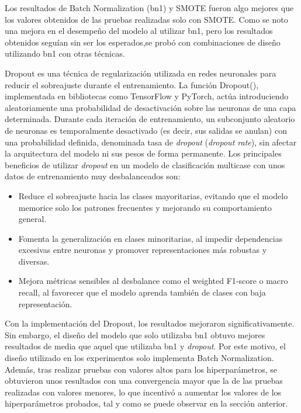 Los resultados de Batch Normalization (bn1) y SMOTE fueron algo mejores que los valores obtenidos de las pruebas realizadas solo con SMOTE. Como se noto una mejora en el desempeño del modelo al utilizar bn1, pero los resultados obtenidos seguían sin ser los esperados,se probó con combinaciones de diseño utilizando bn1 con otras técnicas.

Dropout es una técnica de regularización utilizada en redes neuronales para reducir el sobreajuste durante el entrenamiento. La función Dropout(), implementada en bibliotecas como TensorFlow y PyTorch, actúa introduciendo aleatoriamente una probabilidad de desactivación sobre las neuronas de una capa determinada. Durante cada iteración de entrenamiento, un subconjunto aleatorio de neuronas es temporalmente desactivado (es decir, sus salidas se anulan) con una probabilidad definida, denominada tasa de \textit{dropout} (\textit{dropout rate}), sin afectar la arquitectura del modelo ni sus pesos de forma permanente. Los principales beneficios de utilizar \textit{dropout} en un modelo de clasificación multicase con unos datos de entrenamiento muy desbalanceados son:

\begin{itemize}
	\item Reduce el sobreajuste hacia las clases mayoritarias, evitando que el modelo memorice solo los patrones frecuentes y mejorando su comportamiento general.

	\item Fomenta la generalización en clases minoritarias, al impedir dependencias excesivas entre neuronas y promover representaciones más robustas y diversas.

	\item Mejora métricas sensibles al desbalance como el weighted F1-score o macro recall, al favorecer que el modelo aprenda también de clases con baja representación.
\end{itemize}

Con la implementación del Dropout, los resultados mejoraron significativamente. Sin embargo, el diseño del modelo que solo utilizaba bn1 obtuvo mejores resultados de media que aquel que utilizaba bn1 y \textit{dropout}. Por este motivo, el diseño utilizado en los experimentos solo implementa Batch Normalization. Además, tras realizar pruebas con valores altos para los hiperparámetros, se obtuvieron unos resultados con una convergencia mayor que la de las pruebas realizadas con valores menores, lo que incentivó a aumentar los valores de los hiperparámetros probados, tal y como se puede observar en la sección anterior.



